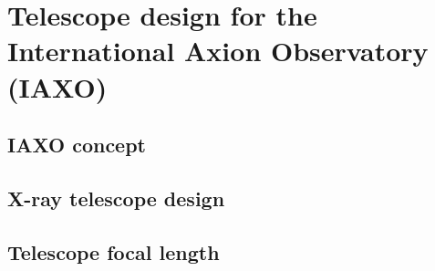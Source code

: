 \chapter{Telescope design for the International Axion Observatory (IAXO)}
\section{IAXO concept}
\section{X-ray telescope design}
\section{Telescope focal length}
